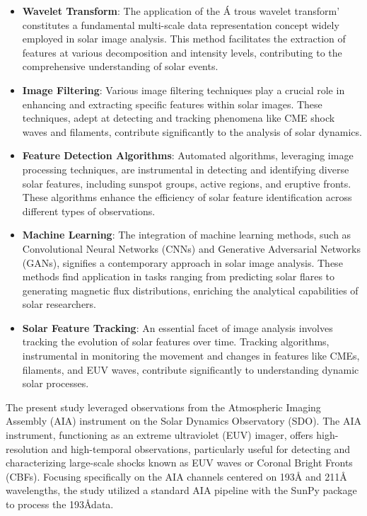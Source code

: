 \begin{itemize}
	\item \textbf{Wavelet Transform}:
	The application of the \'A trous wavelet transform' constitutes a fundamental multi-scale data representation concept widely employed in solar image analysis. This method facilitates the extraction of features at various decomposition and intensity levels, contributing to the comprehensive understanding of solar events.
	
	\item \textbf{Image Filtering}:
	Various image filtering techniques play a crucial role in enhancing and extracting specific features within solar images. These techniques, adept at detecting and tracking phenomena like CME shock waves and filaments, contribute significantly to the analysis of solar dynamics.
	
	\item \textbf{Feature Detection Algorithms}:
	Automated algorithms, leveraging image processing techniques, are instrumental in detecting and identifying diverse solar features, including sunspot groups, active regions, and eruptive fronts. These algorithms enhance the efficiency of solar feature identification across different types of observations.
	
	\item \textbf{Machine Learning}:
	The integration of machine learning methods, such as Convolutional Neural Networks (CNNs) and Generative Adversarial Networks (GANs), signifies a contemporary approach in solar image analysis. These methods find application in tasks ranging from predicting solar flares to generating magnetic flux distributions, enriching the analytical capabilities of solar researchers.
	
	\item \textbf{Solar Feature Tracking}:
	An essential facet of image analysis involves tracking the evolution of solar features over time. Tracking algorithms, instrumental in monitoring the movement and changes in features like CMEs, filaments, and EUV waves, contribute significantly to understanding dynamic solar processes.
\end{itemize}

The present study leveraged observations from the Atmospheric Imaging Assembly (AIA) instrument on the Solar Dynamics Observatory (SDO). The AIA instrument, functioning as an extreme ultraviolet (EUV) imager, offers high-resolution and high-temporal observations, particularly useful for detecting and characterizing large-scale shocks known as EUV waves or Coronal Bright Fronts (CBFs). Focusing specifically on the AIA channels centered on 193Å and 211Å wavelengths, the study utilized a standard AIA pipeline with the SunPy package to process the 193\AA data.

